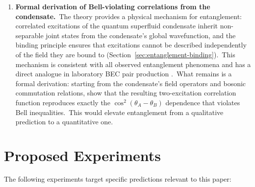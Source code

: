 ﻿\documentclass[12pt,letterpaper]{article}
\begin{document}
\begin{enumerate}[leftmargin=2em]
  \item \textbf{Formal derivation of Bell-violating correlations from the
    condensate.}\ The theory provides a physical mechanism for entanglement:
    correlated excitations of the quantum superfluid condensate inherit
    non-separable joint states from the condensate's global wavefunction,
    and the binding principle ensures that excitations cannot be described
    independently of the field they are bound to
    (Section~\ref{sec:entanglement-binding}).\ This mechanism is consistent
    with all observed entanglement phenomena and has a direct analogue in
    laboratory BEC pair production \cite{steinhauer2016}.\ What remains is
    a formal derivation: starting from the condensate's field operators and
    bosonic commutation relations, show that the resulting two-excitation
    correlation function reproduces exactly the $\cos^2(\theta_A - \theta_B)$
    dependence that violates Bell inequalities.\ This would elevate
    entanglement from a qualitative prediction to a quantitative one.

\end{enumerate}



\section{Proposed Experiments}

The following experiments target specific predictions relevant to this paper:
\end{document}
